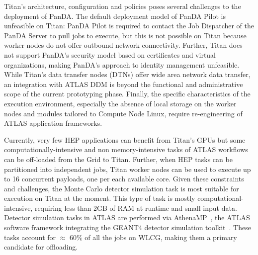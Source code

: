 %

Titan's architecture, configuration and policies poses several challenges to
the deployment of PanDA\@. The default deployment model of PanDA Pilot is
unfeasible on Titan: PanDA Pilot is required to contact the Job Dispatcher of
the PanDA Server to pull jobs to execute, but this is not possible on Titan
because worker nodes do not offer outbound network connectivity. Further,
Titan does not support PanDA's security model based on certificates and
virtual organizations, making PanDA's approach to identity management 
unfeasible. While Titan's data transfer nodes (DTNs) offer wide area network
data transfer, an integration with ATLAS DDM is beyond the functional and
administrative scope of the current prototyping phase. Finally, the specific
characteristics of the execution environment, especially the absence of local
storage on the worker nodes and modules tailored to Compute Node Linux,
require re-engineering of ATLAS application frameworks.

Currently, very few HEP applications can benefit from Titan's GPUs but some
computationally-intensive and non memory-intensive tasks of ATLAS workflows
can be off-loaded from the Grid to Titan. Further, when HEP tasks can be
partitioned into independent jobs, Titan worker nodes can be used to execute
up to 16 concurrent payloads, one per each available core. Given these
constraints and challenges, the  Monte Carlo detector simulation task is most
suitable for execution on Titan at the moment. This type of task is mostly
computational-intensive, requiring less than 2GB of RAM at runtime and small
input data. Detector simulation tasks in ATLAS are performed via
AthenaMP~\cite{aad2010atlas}, the ATLAS software framework integrating the
GEANT4 detector simulation toolkit~\cite{agostinelli2003geant4}. These tasks
account for $\approx$ 60\% of all the jobs on WLCG, making them a primary
candidate for offloading.

